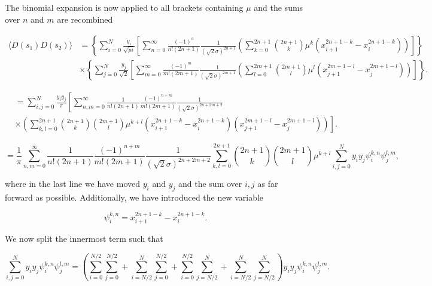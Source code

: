 \documentclass[apj]{emulateapj}
\begin{document}
The binomial expansion is now applied to all brackets containing $\mu$ and the sums over $n$ and $m$ are recombined

\begin{equation}
\begin{aligned}
\langle D(s_1) D(s_2) \rangle &= \left\{ \sum_{i=0}^N  \frac{y_i}{\sqrt{pi}} \left[ \sum_{n = 0}^\infty \frac{(-1)^n}{n! (2n+1)} \frac{1}{(\sqrt{2}\sigma)^{2n+1}} \left( \sum_{k=0}^{2n+1} {2n+1 \choose k} \mu^k ( x_{i+1}^{2n+1-k} - x_{i}^{2n+1-k} ) \right) \right] \right\} \\
&\times \left\{ \sum_{j=0}^N  \frac{y_j}{\sqrt{2}} \left[ \sum_{m = 0}^\infty \frac{(-1)^m}{m! (2m+1)} \frac{1}{(\sqrt{2}\sigma)^{2m+1}} \left( \sum_{l=0}^{2m+1} {2m+1 \choose l} \mu^l ( x_{j+1}^{2m+1-l} - x_{j}^{2m+1-l} ) \right) \right] \right\}.
\end{aligned}
\end{equation}

\begin{equation}
\begin{aligned}
&= \sum_{i,j=0}^N  \frac{y_i y_j}{\pi} \left[ \sum_{n,m = 0}^\infty \frac{1}{n! (2n+1)} \frac{(-1)^{n+m}}{m! (2m+1)} \frac{1}{(\sqrt{2}\sigma)^{2n+2m+2}} \right. \\
& \left. \times \left( \sum_{k, l = 0}^{2n+1} {2n+1 \choose k} {2m+1 \choose l} \mu^{k+l} ( x_{i+1}^{2n+1-k} - x_{i}^{2n+1-k} ) ( x_{j+1}^{2m+1-l}- x_{j}^{2m+1-l}) \right) \right].
\end{aligned}
\end{equation}

\begin{equation} \label{eq:dcompleteklsum}
=  \frac{1}{\pi} \sum_{n,m = 0}^\infty \frac{1}{n! (2n+1)} \frac{(-1)^{n+m}}{m! (2m+1)} \frac{1}{(\sqrt{2}\sigma)^{2n+2m+2}} \sum_{k, l = 0}^{2n+1} {2n+1 \choose k} {2m+1 \choose l} \mu^{k+l} \sum_{i,j=0}^N y_i y_j \psi^{k, n}_i \psi^{l, m}_j,
\end{equation}

where in the last line we have moved $y_i$ and $y_j$ and the sum over $i,j$ as far forward as possible. Additionally, we have introduced the new variable

\begin{equation}
\psi_i^{k,n} = x_{i+1}^{2n+1-k} - x_{i}^{2n+1-k}.
\end{equation}

We now split the innermost term such that

\begin{equation}
\sum_{i,j = 0}^N y_i y_j \psi_i^{k, n} \psi_j^{l, m} = \left( \sum_{i = 0}^{N/2}\sum_{j = 0}^{N/2} + \sum_{i = N/2}^{N}\sum_{j = 0}^{N/2} + \sum_{i = 0}^{N/2}\sum_{j = N/2}^{N} + \sum_{i = N/2}^{N}\sum_{j = N/2}^{N} \right) y_i y_j \psi_i^{k, n} \psi_j^{l, m}.
\end{equation}
\end{document}
